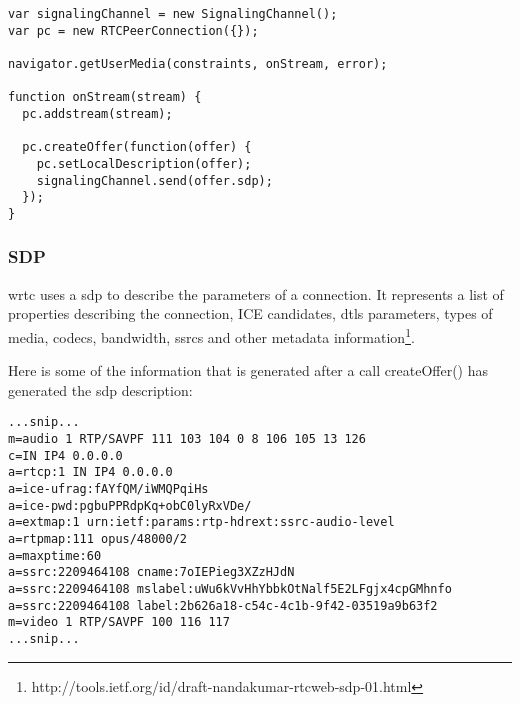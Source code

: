 \begin{lstlisting}
var signalingChannel = new SignalingChannel();
var pc = new RTCPeerConnection({});

navigator.getUserMedia(constraints, onStream, error);

function onStream(stream) {
  pc.addstream(stream);

  pc.createOffer(function(offer) {
    pc.setLocalDescription(offer);
    signalingChannel.send(offer.sdp);
  });
}
\end{lstlisting}


\subsubsection{SDP}
\gls{wrtc} uses a \gls{sdp} to describe the parameters of a connection. It represents a list of properties describing the connection, ICE candidates, \gls{dtls} parameters, types of media, codecs, bandwidth, \gls{ssrc}s and other metadata information\footnote{http://tools.ietf.org/id/draft-nandakumar-rtcweb-sdp-01.html}.



Here is some of the information that is generated after a call createOffer() has generated the \gls{sdp} description:

\begin{lstlisting}[frame=single]
...snip...
m=audio 1 RTP/SAVPF 111 103 104 0 8 106 105 13 126
c=IN IP4 0.0.0.0
a=rtcp:1 IN IP4 0.0.0.0
a=ice-ufrag:fAYfQM/iWMQPqiHs
a=ice-pwd:pgbuPPRdpKq+obC0lyRxVDe/
a=extmap:1 urn:ietf:params:rtp-hdrext:ssrc-audio-level
a=rtpmap:111 opus/48000/2
a=maxptime:60
a=ssrc:2209464108 cname:7oIEPieg3XZzHJdN
a=ssrc:2209464108 mslabel:uWu6kVvHhYbbkOtNalf5E2LFgjx4cpGMhnfo
a=ssrc:2209464108 label:2b626a18-c54c-4c1b-9f42-03519a9b63f2
m=video 1 RTP/SAVPF 100 116 117
...snip...
\end{lstlisting}


